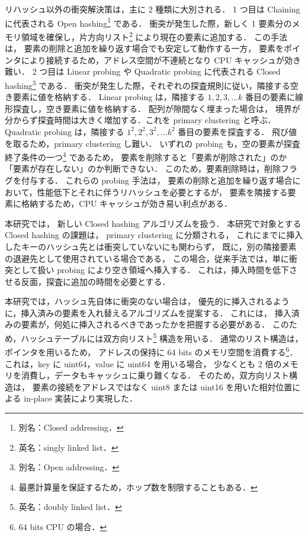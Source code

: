 リハッシュ以外の衝突解決策は，主に 2 種類に大別される．
1 つ目は Chaining に代表される Open hashing\footnote{別名：Closed addressing．} である．
衝突が発生した際，新しく 1 要素分のメモリ領域を確保し，片方向リスト\footnote{英名：singly linked list．} により現在の要素に追加する．
この手法は，
要素の削除と追加を繰り返す場合でも安定して動作する一方，
要素をポインタにより接続するため，アドレス空間が不連続となり CPU キャッシュが効き難い．
2 つ目は Linear probing や Quadratic probing に代表される Closed hashing\footnote{別名：Open addressing．} である．
衝突が発生した際，それぞれの探査規則に従い，隣接する空き要素に値を格納する．
Linear probing は，隣接する $1, 2, 3, ... k$ 番目の要素に線形探査し，空き要素に値を格納する．
配列が隙間なく埋まった場合は，
境界が分からず探査時間は大きく増加する．これを primary clustering と呼ぶ．
Quadratic probing は，隣接する $1^2, 2^2, 3^2, ... k^2$ 番目の要素を探査する．
飛び値を取るため，primary clustering し難い．
いずれの probing も，空の要素が探査終了条件の一つ\footnote{最悪計算量を保証するため，ホップ数を制限することもある．} であるため，
要素を削除すると「要素が削除された」のか「要素が存在しない」のか判断できない．
このため，要素削除時は，削除フラグを付与する．
これらの probing 手法は，
要素の削除と追加を繰り返す場合において，性能低下とそれに伴うリハッシュを必要とするが，
要素を隣接する要素に格納するため，CPU キャッシュが効き易い利点がある．


本研究では，
新しい Closed hashing アルゴリズムを扱う．
本研究で対象とする Closed hashing の課題は，
primary clustering に分類される，
これにまでに挿入したキーのハッシュ先とは衝突していないにも関わらず，
既に，別の隣接要素の退避先として使用されている場合である，
この場合，従来手法では，単に衝突として扱い probing により空き領域へ挿入する．
これは，挿入時間を低下させる反面，探査に追加の時間を必要とする．

本研究では，ハッシュ先自体に衝突のない場合は，
優先的に挿入されるように，挿入済みの要素を入れ替えるアルゴリズムを提案する．
これには，
挿入済みの要素が，何処に挿入されるべきであったかを把握する必要がある．
このため，ハッシュテーブルには双方向リスト\footnote{英名：doubly linked list．} 構造を用いる．
通常のリスト構造は，ポインタを用いるため，
アドレスの保持に 64 bits のメモリ空間を消費する\footnote{64 bits CPU の場合．}．
これは，key に uint64，value に uint64 を用いる場合，
少なくとも 2 倍のメモリを消費し，データもキャッシュに乗り難くなる．
そのため，双方向リスト構造は，
要素の接続をアドレスではなく uint8 または uint16 を用いた相対位置による in-place 実装により実現した．

